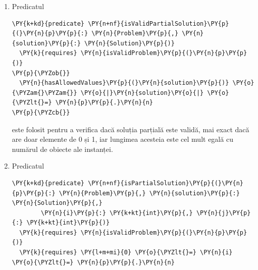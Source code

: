 \begin{sloppypar}
\begin{enumerate}
\begin{Verbatim}[commandchars=\\\{\}]
\PY{k+kd}{predicate} \PY{n+nf}{isValidProblem}\PY{p}{(}\PY{n}{p}\PY{p}{:} \PY{n}{Problem}\PY{p}{)}
\PY{p}{\PYZob{}}
  \PY{o}{|}\PY{n}{p}\PY{p}{.}\PY{n}{gains}\PY{o}{|} \PY{o}{==} \PY{o}{|}\PY{n}{p}\PY{p}{.}\PY{n}{weights}\PY{o}{|} \PY{o}{==} \PY{n}{p}\PY{p}{.}\PY{n}{n} \PY{o}{\PYZam{}\PYZam{}} 
  \PY{n}{p}\PY{p}{.}\PY{n}{n} \PY{o}{\PYZgt{}} \PY{l+m+mi}{0} \PY{o}{\PYZam{}\PYZam{}} \PY{n}{p}\PY{p}{.}\PY{n}{c} \PY{o}{\PYZgt{}=} \PY{l+m+mi}{0} \PY{o}{\PYZam{}\PYZam{}} 
  \PY{n}{hasPositiveValues}\PY{p}{(}\PY{n}{p}\PY{p}{.}\PY{n}{gains}\PY{p}{)} \PY{o}{\PYZam{}\PYZam{}} \PY{n}{hasPositiveValues}\PY{p}{(}\PY{n}{p}\PY{p}{.}\PY{n}{weights}\PY{p}{)} 
\PY{p}{\PYZcb{}}
\end{Verbatim}
    este un predicat foarte important, folosit ca precondiție aproape pentru fiecare metodă și lemă din cod. Acest predicat este folosit ca validator pentru instanța problemei a cărei soluție optimă încercăm să găsim. Ne așteptăm astfel să avem cel puțin un obiect la dispoziție și un rucsac de capacitate mai mare decât zero, să știm greutatea și câștigul fiecărui obiect, iar acestea să fie la rândul lor valori pozitive diferite de zero.
    \item Predicatul 
    \begin{Verbatim}[commandchars=\\\{\}]
\PY{k+kd}{predicate} \PY{n+nf}{isValidPartialSolution}\PY{p}{(}\PY{n}{p}\PY{p}{:} \PY{n}{Problem}\PY{p}{,} \PY{n}{solution}\PY{p}{:} \PY{n}{Solution}\PY{p}{)}
  \PY{k}{requires} \PY{n}{isValidProblem}\PY{p}{(}\PY{n}{p}\PY{p}{)}
\PY{p}{\PYZob{}}
  \PY{n}{hasAllowedValues}\PY{p}{(}\PY{n}{solution}\PY{p}{)} \PY{o}{\PYZam{}\PYZam{}} \PY{o}{|}\PY{n}{solution}\PY{o}{|} \PY{o}{\PYZlt{}=} \PY{n}{p}\PY{p}{.}\PY{n}{n}
\PY{p}{\PYZcb{}}
\end{Verbatim}
    este folosit pentru a verifica dacă soluția parțială este validă, mai exact dacă are doar elemente de 0 și 1, iar lungimea acesteia este cel mult egală cu numărul de obiecte ale instanței.
    \item Predicatul 
    \begin{Verbatim}[commandchars=\\\{\}]
\PY{k+kd}{predicate} \PY{n+nf}{isPartialSolution}\PY{p}{(}\PY{n}{p}\PY{p}{:} \PY{n}{Problem}\PY{p}{,} \PY{n}{solution}\PY{p}{:} \PY{n}{Solution}\PY{p}{,} 
        \PY{n}{i}\PY{p}{:} \PY{k+kt}{int}\PY{p}{,} \PY{n}{j}\PY{p}{:} \PY{k+kt}{int}\PY{p}{)}
  \PY{k}{requires} \PY{n}{isValidProblem}\PY{p}{(}\PY{n}{p}\PY{p}{)}
  \PY{k}{requires} \PY{l+m+mi}{0} \PY{o}{\PYZlt{}=} \PY{n}{i} \PY{o}{\PYZlt{}=} \PY{n}{p}\PY{p}{.}\PY{n}{n}

\end{Verbatim}
\end{enumerate}
\end{sloppypar}
